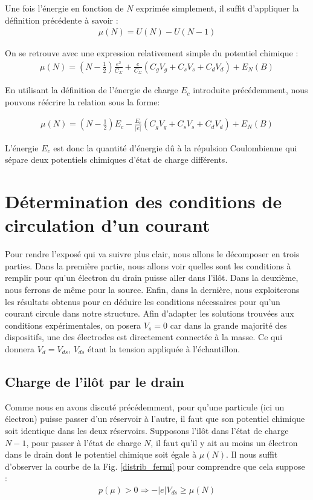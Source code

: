 Une fois l'énergie en fonction de $N$ exprimée simplement, il suffit d'appliquer la définition précédente à savoir :
\begin{eqnarray}
\mu(N) = U(N) - U(N-1) \nonumber
\end{eqnarray}

On se retrouve avec une expression relativement simple du potentiel chimique :
\begin{eqnarray}
\mu(N) = (N-\frac{1}{2})\frac{e^2}{C_{\Sigma}}
+ 
\frac{e}{C_{\Sigma}}(C_gV_g + C_sV_s + C_dV_d)
+
E_N(B)
\end{eqnarray}

En utilisant la définition de l'énergie de charge $E_c$ introduite précédemment, nous pouvons réécrire la relation sous la forme:

\begin{eqnarray}
\mu(N) = (N-\frac{1}{2})E_c
- 
\frac{E_c}{|e|}(C_gV_g + C_sV_s + C_dV_d)
+
E_N(B)
\label{pot_chim}
\end{eqnarray}

L'énergie $E_c$ est donc la quantité d'énergie d\^u à la répulsion Coulombienne qui sépare deux potentiels chimiques d'état de charge différents.


\section{Détermination des conditions de circulation d'un courant}
Pour rendre l'exposé qui va suivre plus clair, nous allons le décomposer en trois parties. Dans la première partie, nous allons voir quelles sont les conditions à remplir pour qu'un électron du drain puisse aller dans l'il\^ot. Dans la deuxième, nous ferrons de m\^eme pour la source. Enfin, dans la dernière, nous exploiterons les résultats obtenus pour en déduire les conditions nécessaires pour qu'un courant circule dans notre structure. Afin d'adapter les solutions trouvées aux conditions expérimentales, on posera $V_s = 0$ car dans la grande majorité des dispositifs, une des électrodes est directement connectée à la masse. Ce qui donnera $V_d=V_{ds}$, $V_{ds}$ étant la tension appliquée à l'échantillon.

\subsection{Charge de l'il\^ot par le drain}
Comme nous en avons discuté précédemment, pour qu'une particule (ici un électron) puisse passer d'un réservoir à l'autre, il faut que son potentiel chimique soit identique dans les deux réservoirs. Supposons l'il\^ot dans l'état de charge $N-1$, pour passer à l'état de charge $N$, il faut qu'il y ait au moins un électron dans le drain dont le potentiel chimique soit égale à $\mu(N)$. Il nous suffit d'observer la courbe de la Fig. \ref{distrib_fermi} pour comprendre que cela suppose :
\begin{eqnarray}
p(\mu) > 0 \Longrightarrow  -|e|V_{ds} \geq \mu(N) \nonumber
\end{eqnarray}

